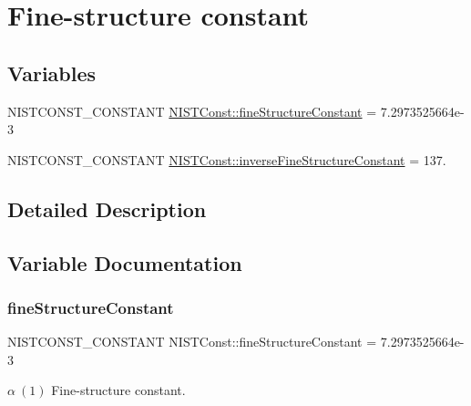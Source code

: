 \hypertarget{group___n_i_s_t_const-_fine_structure_constant}{}\section{Fine-\/structure constant}
\label{group___n_i_s_t_const-_fine_structure_constant}
\subsection*{Variables}
\begin{DoxyCompactItemize}
\item 
N\+I\+S\+T\+C\+O\+N\+S\+T\+\_\+\+C\+O\+N\+S\+T\+A\+NT \mbox{\hyperlink{group___n_i_s_t_const-_fine_structure_constant_ga67cf20054caf1e81add883470b89db51}{N\+I\+S\+T\+Const\+::fine\+Structure\+Constant}} = 7.\+2973525664e-\/3
\item 
N\+I\+S\+T\+C\+O\+N\+S\+T\+\_\+\+C\+O\+N\+S\+T\+A\+NT \mbox{\hyperlink{group___n_i_s_t_const-_fine_structure_constant_gab0b66cc7e11797dce82219a024123a12}{N\+I\+S\+T\+Const\+::inverse\+Fine\+Structure\+Constant}} = 137.
\end{DoxyCompactItemize}


\subsection{Detailed Description}


\subsection{Variable Documentation}
\mbox{\label{group___n_i_s_t_const-_fine_structure_constant_ga67cf20054caf1e81add883470b89db51}} 
\subsubsection{\texorpdfstring{fine\+Structure\+Constant}{fineStructureConstant}}
{\footnotesize\ttfamily N\+I\+S\+T\+C\+O\+N\+S\+T\+\_\+\+C\+O\+N\+S\+T\+A\+NT N\+I\+S\+T\+Const\+::fine\+Structure\+Constant = 7.\+2973525664e-\/3}

$\alpha \ (1)$ Fine-\/structure constant. \mbox{\label{group___n_i_s_t_const-_fine_structure_constant_gab0b66cc7e11797dce82219a024123a12}} 
